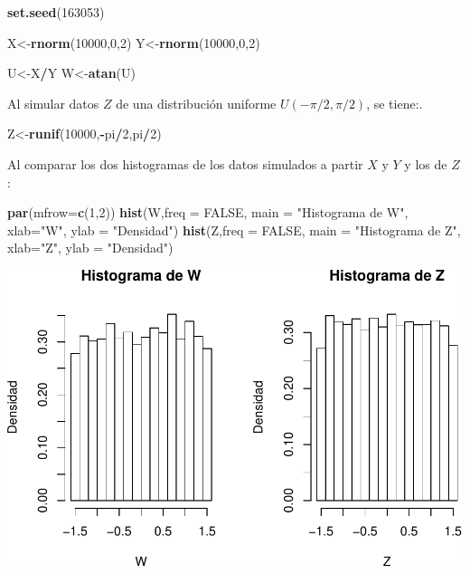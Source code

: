 \documentclass[]{article}
\newenvironment{Shaded}{\begin{snugshade}}{\end{snugshade}}
\newcommand{\KeywordTok}[1]{\textcolor[rgb]{0.13,0.29,0.53}{\textbf{#1}}}
\newcommand{\DataTypeTok}[1]{\textcolor[rgb]{0.13,0.29,0.53}{#1}}
\newcommand{\DecValTok}[1]{\textcolor[rgb]{0.00,0.00,0.81}{#1}}
\newcommand{\StringTok}[1]{\textcolor[rgb]{0.31,0.60,0.02}{#1}}
\newcommand{\OtherTok}[1]{\textcolor[rgb]{0.56,0.35,0.01}{#1}}
\newcommand{\OperatorTok}[1]{\textcolor[rgb]{0.81,0.36,0.00}{\textbf{#1}}}
\newcommand{\NormalTok}[1]{#1}
\begin{document}
\begin{Shaded}
\begin{Highlighting}[]
\KeywordTok{set.seed}\NormalTok{(}\DecValTok{163053}\NormalTok{)}

\NormalTok{X<-}\KeywordTok{rnorm}\NormalTok{(}\DecValTok{10000}\NormalTok{,}\DecValTok{0}\NormalTok{,}\DecValTok{2}\NormalTok{)}
\NormalTok{Y<-}\KeywordTok{rnorm}\NormalTok{(}\DecValTok{10000}\NormalTok{,}\DecValTok{0}\NormalTok{,}\DecValTok{2}\NormalTok{)}

\NormalTok{U<-X}\OperatorTok{/}\NormalTok{Y}
\NormalTok{W<-}\KeywordTok{atan}\NormalTok{(U)}
\end{Highlighting}
\end{Shaded}

Al simular datos \(Z\) de una distribución uniforme \(U(-\pi/2,\pi/2)\),
se tiene:.

\begin{Shaded}
\begin{Highlighting}[]
\NormalTok{Z<-}\KeywordTok{runif}\NormalTok{(}\DecValTok{10000}\NormalTok{,}\OperatorTok{-}\NormalTok{pi}\OperatorTok{/}\DecValTok{2}\NormalTok{,pi}\OperatorTok{/}\DecValTok{2}\NormalTok{)}
\end{Highlighting}
\end{Shaded}

Al comparar los dos histogramas de los datos simulados a partir \(X\) y
\(Y\) y los de \(Z\):

\begin{Shaded}
\begin{Highlighting}[]
\KeywordTok{par}\NormalTok{(}\DataTypeTok{mfrow=}\KeywordTok{c}\NormalTok{(}\DecValTok{1}\NormalTok{,}\DecValTok{2}\NormalTok{))}
\KeywordTok{hist}\NormalTok{(W,}\DataTypeTok{freq =} \OtherTok{FALSE}\NormalTok{, }\DataTypeTok{main =} \StringTok{"Histograma de W"}\NormalTok{, }\DataTypeTok{xlab=}\StringTok{"W"}\NormalTok{, }\DataTypeTok{ylab =} \StringTok{"Densidad"}\NormalTok{)}
\KeywordTok{hist}\NormalTok{(Z,}\DataTypeTok{freq =} \OtherTok{FALSE}\NormalTok{, }\DataTypeTok{main =} \StringTok{"Histograma de Z"}\NormalTok{, }\DataTypeTok{xlab=}\StringTok{"Z"}\NormalTok{, }\DataTypeTok{ylab =} \StringTok{"Densidad"}\NormalTok{)}
\end{Highlighting}
\end{Shaded}

\includegraphics[width=0.75\linewidth]{notebook_simulaciones_files/figure-latex/unnamed-chunk-8-1}
\end{document}
